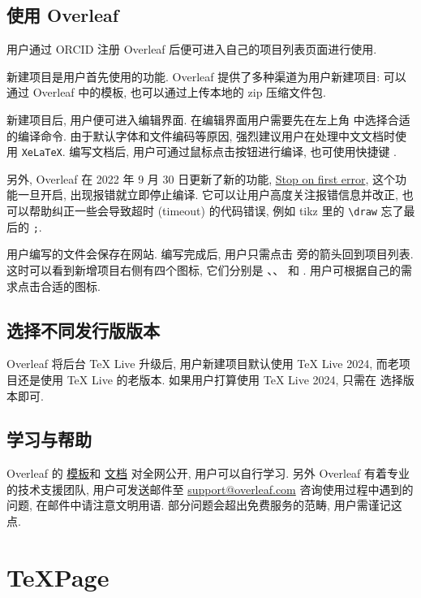 \subsection{使用 Overleaf}

用户通过 ORCID 注册 Overleaf 后便可进入自己的项目列表页面进行使用.

新建项目是用户首先使用的功能.
Overleaf 提供了多种渠道为用户新建项目:
可以通过 Overleaf 中的模板,
也可以通过上传本地的 \textsf{zip} 压缩文件包.

新建项目后,
用户便可进入编辑界面.
在编辑界面用户需要先在左上角  中选择合适的编译命令.
由于默认字体和文件编码等原因,
强烈建议用户在处理中文文档时使用 \texttt{XeLaTeX}.
编写文档后,
用户可通过鼠标点击按钮进行编译,
也可使用快捷键 .

另外,
Overleaf 在 2022 年 9 月 30 日更新了新的功能,
\href{https://www.overleaf.com/blog/new-feature-stop-on-first-error-compilation-mode}{Stop on first error},
这个功能一旦开启,
出现报错就立即停止编译.
它可以让用户高度关注报错信息并改正,
也可以帮助纠正一些会导致超时 (timeout) 的代码错误,
例如 tikz 里的 \verb+\draw+ 忘了最后的 \verb+;+.

用户编写的文件会保存在网站.
编写完成后,
用户只需点击  旁的箭头回到项目列表.
这时可以看到新增项目右侧有四个图标,
它们分别是 、、 和 .
用户可根据自己的需求点击合适的图标.

\subsection{选择不同发行版版本}

Overleaf 将后台 \TeX{} Live 升级后,
用户新建项目默认使用 \TeX{} Live 2024,
而老项目还是使用 \TeX{} Live 的老版本.
如果用户打算使用 \TeX{} Live 2024,
只需在  选择版本即可.

\subsection{学习与帮助}

Overleaf 的%
\href{https://www.overleaf.com/latex/templates}{模板}和%
\href{https://www.overleaf.com/learn}{文档}%
对全网公开,
用户可以自行学习.
另外 Overleaf 有着专业的技术支援团队,
用户可发送邮件至 \href{mailto:support@overleaf.com}%
{\ttfamily support@overleaf.com}
咨询使用过程中遇到的问题,
在邮件中请注意文明用语.
部分问题会超出免费服务的范畴,
用户需谨记这点.

\section{TeXPage}


